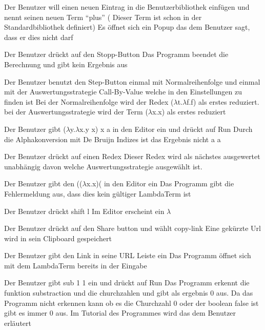 \documentclass[parskip=full,11pt,twoside]{scrartcl}
\begin{document}
{Der Benutzer will einen neuen Eintrag in die Benutzerbibliothek einfügen und nennt seinen neuen Term \enquote{plus} ( Dieser Term ist schon in der Standardbibliothek definiert) }
{Es öffnet sich ein Popup das dem Benutzer sagt, dass er dies nicht darf}

{Der Benutzer drückt auf den Stopp-Button}
{ Das Programm beendet die Berechnung und gibt kein Ergebnis aus }

{Der Benutzer benutzt den Step-Button einmal mit Normalreihenfolge  und einmal mit der Auswertungsstrategie Call-By-Value welche in den Einstellungen zu finden ist}
{ Bei der Normalreihenfolge wird der Redex ($\lambda$t.$\lambda$f.f) als erstes reduziert. bei der Auswertungsstrategie wird der Term ($\lambda$x.x) als erstes reduziert }

{ Der Benutzer gibt ($\lambda$y.$\lambda$x.y x) x a in den Editor ein und drückt auf Run}
{ Durch die Alphakonversion mit De Bruijn Indizes ist das Ergebnis nicht a  a  }

 { Der Benutzer drückt auf einen Redex}
{ Dieser Redex wird als nächstes ausgewertet unabhängig davon welche Auswertungsstrategie ausgewählt ist. }

{ Der Benutzer gibt den (($\lambda$x.x)( in den Editor ein }
{ Das Programm gibt die Fehlermeldung aus, dass dies kein gültiger LambdaTerm ist }

{ Der Benutzer drückt shift l }
{Im Editor erscheint ein $\lambda$}

{ Der Benutzer drückt auf den Share button und wählt copy-link}
{ Eine gekürzte Url wird in sein Clipboard gespeichert }

{Der Benutzer gibt den Link in seine URL Leiste ein }
{ Das Programm öffnet sich mit dem LambdaTerm bereits in der Eingabe }

{ Der Benutzer gibt sub 1 1 ein und drückt auf Run }
{ Das Programm erkennt die funktion substraction und die churchzahlen und gibt als ergebnis 0 aus. Da das Programm nicht erkennen kann ob es die Churchzahl 0 oder der boolean false ist gibt es immer 0 aus. Im Tutorial des Programmes wird das dem Benutzer erläutert }
\end{document}
